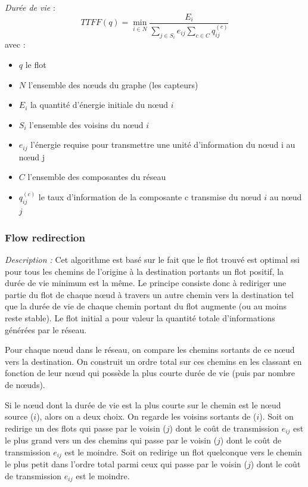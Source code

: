 \emph{Durée de vie} :  $$TTFF(q) = \min\limits_{i \in N}\frac{E_i}{\sum \limits_{j \in S_i} {e_{ij}} \sum \limits_{c \in C} {q_{ij}^{(c)}}}$$
avec :
\begin{itemize}
\item $q$ le flot
\item $N$ l'ensemble des nœuds du graphe (les capteurs)
\item $E_i$ la quantité d'énergie initiale du nœud $i$
\item $S_i$ l'ensemble des voisins du nœud $i$
\item $e_{ij}$ l'énergie requise pour transmettre une unité d'information du nœud i au nœud j
\item $C$ l'ensemble des composantes du réseau
\item $q_{ij}^{(c)}$ le taux d'information de la composante c transmise du nœud $i$ au nœud $j$
\end{itemize}



\subsubsection{Flow redirection \cite{Chang2000}}


\emph{Description :}
Cet algorithme est basé sur le fait que le flot trouvé est optimal ssi pour tous les chemins de l'origine à la destination portants un flot positif, la durée de vie minimum est la même. Le principe consiste donc à rediriger une partie du flot de chaque nœud à travers un autre chemin vers la destination tel que la durée de vie de chaque chemin portant du flot augmente (ou au moins reste stable). Le flot initial a pour valeur la quantité totale d'informations générées par le réseau.

Pour chaque nœud dans le réseau, on compare les chemins sortants de ce nœud vers la destination. On construit un ordre total sur ces chemins en les classant en fonction de leur nœud qui possède la plus courte durée de vie (puis par nombre de nœuds).

Si le nœud dont la durée de vie est la plus courte sur le chemin est le nœud source ($i$), alors on a deux choix. On regarde les voisins sortants de ($i$). Soit on redirige un des flots qui passe par le voisin ($j$) dont le coût de transmission $e_{ij}$ est le plus grand vers un des chemins qui passe par le voisin ($j$) dont le coût de transmission $e_{ij}$ est le moindre. Soit on redirige un flot quelconque vers le chemin le plus petit dans l'ordre total parmi ceux qui passe par le voisin ($j$) dont le coût de transmission $e_{ij}$ est le moindre.

